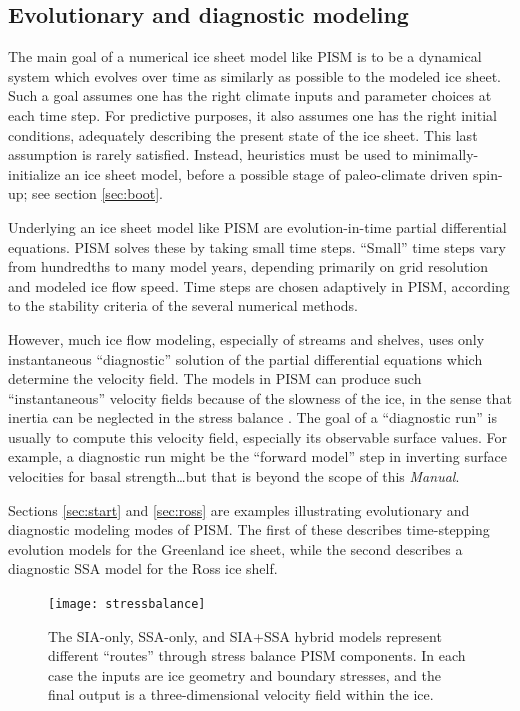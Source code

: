 \documentclass[titlepage,letterpaper,final]{scrartcl}
\begin{document}
\subsection{Evolutionary and diagnostic modeling} \label{subsect:basicmodes}    The main goal of a numerical ice sheet model like PISM is to be a dynamical system which evolves over time as similarly as possible to the modeled ice sheet.  Such a goal assumes one has the right climate inputs and parameter choices at each time step.  For predictive purposes, it also assumes one has the right initial conditions, adequately describing the present state of the ice sheet.  This last assumption is rarely satisfied.  Instead, heuristics must be used to minimally-initialize an ice sheet model, before a possible stage of paleo-climate driven spin-up; see section \ref{sec:boot}.

Underlying an ice sheet model like PISM are evolution-in-time partial differential equations.  PISM solves these by taking small time steps.  ``Small'' time steps vary from hundredths to many model years, depending primarily on grid resolution and modeled ice flow speed.  Time steps are chosen adaptively in PISM, according to the stability criteria of the several numerical methods.

However, much ice flow modeling, especially of streams and shelves, uses only instantaneous ``diagnostic'' solution of the partial differential equations which determine the velocity field.  The models in PISM can produce such ``instantaneous'' velocity fields because of the slowness of the ice, in the sense that inertia can be neglected in the stress balance \cite{Fowler}.  The goal of a ``diagnostic run'' is usually to compute this velocity field, especially its observable surface values.  For example, a diagnostic run might be the ``forward model'' step in inverting surface velocities for basal strength\dots but that is beyond the scope of this \emph{Manual}.

Sections \ref{sec:start} and \ref{sec:ross} are examples illustrating evolutionary and diagnostic modeling modes of PISM.  The first of these describes time-stepping evolution models for the Greenland ice sheet, while the second describes a diagnostic SSA model for the Ross ice shelf.


\begin{figure}
  \centering
  \texttt{[image: stressbalance]}
  \caption{The SIA-only, SSA-only, and SIA+SSA hybrid models represent different ``routes'' through stress balance PISM components.  In each case the inputs are ice geometry and boundary stresses, and the final output is a three-dimensional velocity field within the ice.}
  \label{fig:stressbalance}
\end{figure}
\end{document}
